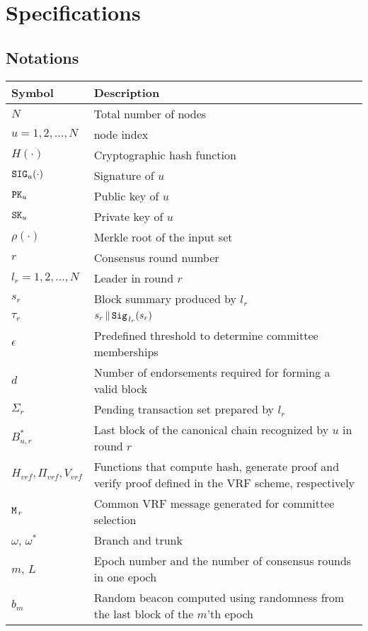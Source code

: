 \documentclass{article}
\begin{document}
\section{Specifications}
\subsection{Notations}
\renewcommand{\arraystretch}{2}
\begin{longtable}{p{3cm} p{10cm}}
    Symbol  & Description \\
    \hline\hline
    $N$ & Total number of nodes \\
    \hline
    $u=1,2,\dots,N$ & node index \\
    \hline
    $H(\cdot)$ & Cryptographic hash function \\
    \hline
    ${\tt SIG}_u(\cdot)$ & Signature of $u$ \\
    \hline
    ${\tt PK}_u$ & Public key of $u$ \\
    \hline
    ${\tt SK}_u$ & Private key of $u$ \\
    \hline
    $\rho\left(\cdot\right)$ & Merkle root of the input set\\
    \hline
    $r$ & Consensus round number \\
    \hline
    $l_r=1,2,...,N$ & Leader in round $r$ \\
    \hline
    $s_r$ & Block summary produced by $l_r$ \\
    \hline
    $\tau_r$ & $s_r\,\|\,{\tt Sig}_{\,l_r}(s_r)$ \\
    \hline
    $\epsilon$ & Predefined threshold to determine committee memberships \\
    \hline
    $d$ & Number of endorsements required for forming a valid block \\
    \hline
    $\Sigma_r$ & Pending transaction set prepared by $l_r$ \\
    \hline
    $B_{u,r}^*$ & Last block of the canonical chain recognized by $u$ in round $r$\\ 
    \hline
    $H_{vrf},\Pi_{vrf},V_{vrf}$ & Functions that compute hash, generate proof and verify proof defined in the VRF scheme, respectively \\
    \hline
    ${\tt M}_{\,r}$ & Common VRF message generated for committee selection \\
    \hline
    $\omega$, $\omega^*$ & Branch and trunk \\
    \hline
    $m$, $L$ & Epoch number and the number of consensus rounds in one epoch \\
    \hline
    $b_m$ & Random beacon computed using randomness from the last block of the $m$'th epoch \\
    \hline
\end{longtable}
\end{document}
